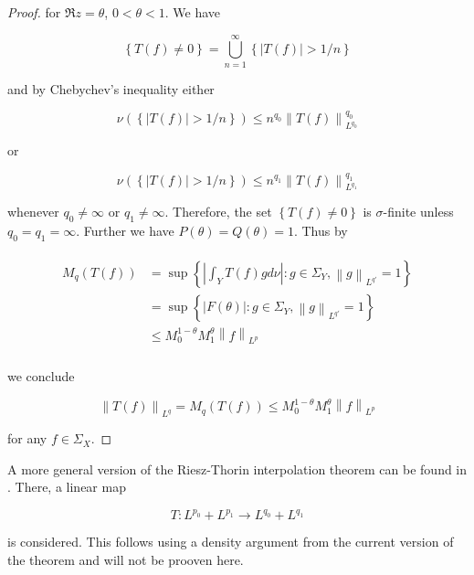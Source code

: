 \begin{proof}
for $\Re z = \theta$, $0 < \theta < 1$. We have

\begin{equation*}
	\left\{ T(f) \neq 0\right\} = \bigcup_{n = 1}^\infty \left\{ \left| T(f)\right| > 1/n\right\}
\end{equation*}

and by Chebychev's inequality either

\begin{equation*}
	\nu\left( \left\{ \left| T(f)\right| > 1/n\right\} \right) \leqslant n^{q_0}\left\| T(f)\right\|_{L^{q_0}}^{q_0}
\end{equation*}

or

\begin{equation*}
	\nu\left( \left\{ \left| T(f)\right| > 1/n\right\} \right) \leqslant n^{q_1}\left\| T(f)\right\|_{L^{q_1}}^{q_1}
\end{equation*}

whenever $q_0 \neq \infty$ or $q_1 \neq \infty$. Therefore, the set $\left\{ T(f) \neq 0\right\}$ is $\sigma$-finite unless $q_0 = q_1 = \infty$. Further we have $P(\theta) = Q(\theta) = 1$. Thus by

\begin{gather*}
	\begin{aligned}
		M_q\left( T(f) \right) &= \sup\left\{\left| \int_Y T(f)gd\nu\right| : g \in \Sigma_Y, \left\|g\right\|_{L^{q'}} = 1\right\}\\
		&=  \sup\left\{\left| F(\theta)\right| : g \in \Sigma_Y, \left\|g\right\|_{L^{q'}} = 1\right\}\\
		&\leqslant M_0^{1 - \theta}M_1^\theta \left\|f\right\|_{L^p}\\
	\end{aligned}
\end{gather*}

we conclude 
	
\begin{equation*}
	\left\| T(f)\right\|_{L^q} = M_q\left( T(f) \right) \leqslant M_0^{1 - \theta}M_1^\theta \left\|f\right\|_{L^p}
\end{equation*}
	
for any $f \in \Sigma_X$.
\end{proof}

\begin{remark*}
	A more general version of the Riesz-Thorin interpolation theorem can be found in \textup{\cite[200--202]{folland:real_analysis:1999}}. There, a linear map 

	\begin{equation*}
		T: L^{p_0} + L^{p_1} \rightarrow L^{q_0} + L^{q_1}
	\end{equation*}

	is considered. This follows using a density argument from the current version of the theorem and will not be prooven here.
	\label{rem:extension}
\end{remark*}

